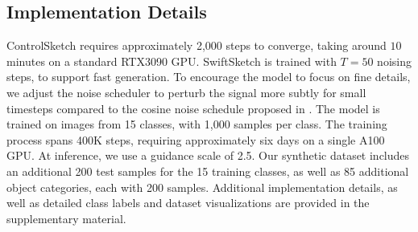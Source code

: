 \subsection{Implementation Details}
ControlSketch requires approximately 2,000 steps to converge, taking around $10$ minutes on a standard RTX3090 GPU.
SwiftSketch is trained with $T = 50$ noising steps, to support fast generation. 
To encourage the model to focus on fine details, we adjust the noise scheduler to perturb the signal more subtly for small timesteps compared to the cosine noise schedule proposed in \cite{Nichol2021ImprovedDD}.
The model is trained on images from 15 classes, with 1,000 samples per class. The training process spans 400K steps, requiring approximately six days on a single A100 GPU. At inference, we use a guidance scale of 2.5. Our synthetic dataset includes an additional 200 test samples for the 15 training classes, as well as 85 additional object categories, each with 200 samples. Additional implementation details, as well as detailed class labels and dataset visualizations are provided in the supplementary material.












    



    
